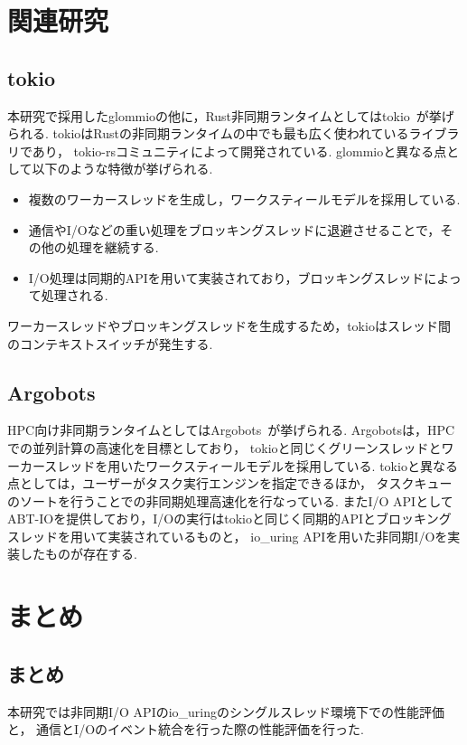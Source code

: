 \documentclass[a4paper,11pt,openany]{jreport}
\begin{document}
\chapter{関連研究}
\section{tokio}
本研究で採用したglommioの他に，Rust非同期ランタイムとしてはtokio~\cite{tokio}が挙げられる.
tokioはRustの非同期ランタイムの中でも最も広く使われているライブラリであり，
tokio-rsコミュニティによって開発されている.
glommioと異なる点として以下のような特徴が挙げられる.

\begin{itemize}
	\item 複数のワーカースレッドを生成し，ワークスティールモデルを採用している.
	\item 通信やI/Oなどの重い処理をブロッキングスレッドに退避させることで，その他の処理を継続する.
	\item I/O処理は同期的APIを用いて実装されており，ブロッキングスレッドによって処理される.
\end{itemize}

ワーカースレッドやブロッキングスレッドを生成するため，tokioはスレッド間のコンテキストスイッチが発生する.

\section{Argobots}
HPC向け非同期ランタイムとしてはArgobots~\cite{argobots}が挙げられる.
Argobotsは，HPCでの並列計算の高速化を目標としており，
tokioと同じくグリーンスレッドとワーカースレッドを用いたワークスティールモデルを採用している.
tokioと異なる点としては，ユーザーがタスク実行エンジンを指定できるほか，
タスクキューのソートを行うことでの非同期処理高速化を行なっている.
またI/O APIとしてABT-IOを提供しており，I/Oの実行はtokioと同じく同期的APIとブロッキングスレッドを用いて実装されているものと，
io\_uring APIを用いた非同期I/Oを実装したものが存在する.


\chapter{まとめ}
\section{まとめ}
本研究では非同期I/O APIのio\_uringのシングルスレッド環境下での性能評価と，
通信とI/Oのイベント統合を行った際の性能評価を行った.
\end{document}
